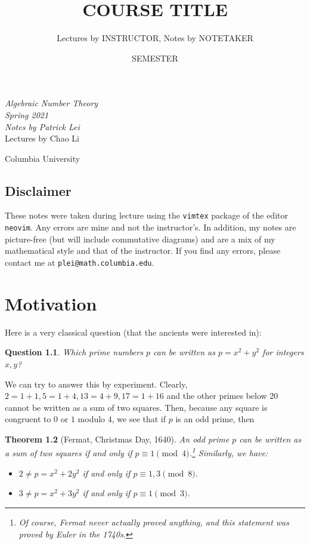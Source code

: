\documentclass[leqno, openany]{memoir}
\title{COURSE TITLE}
\author{Lectures by INSTRUCTOR, Notes by NOTETAKER}
\date{SEMESTER}
\newtheorem{thm}{Theorem}[section]
\newtheorem{quest}[thm]{Question}
\theoremstyle{definition}
\theoremstyle{remark}
\theoremstyle{plain}
\theoremstyle{definition}
\theoremstyle{remark}
\newcommand*{\titleSW}
    {\begingroup%
    \raggedleft
    \vspace*{\baselineskip}
    {\Huge\itshape Algebraic Number Theory \\ Spring 2021}\\[\baselineskip]
    {\large\itshape Notes by Patrick Lei}\\[0.2\textheight]
    {\Large Lectures by Chao Li}\par
    \vfill
    {\Large \sffamily Columbia University}
    \vspace*{\baselineskip}
\endgroup}
\begin{document}
    
\begin{titlingpage}
\titleSW
\end{titlingpage}

\thispagestyle{empty}
\section*{Disclaimer}%
\label{sec:disclaimer}

These notes were taken during lecture using the \texttt{vimtex} package of the
editor \texttt{neovim}.  Any errors are mine and not the instructor's.  In
addition, my notes are picture-free (but will include commutative diagrams) and
are a mix of my mathematical style and that of the instructor.  If you find any
errors, please contact me at \texttt{plei@math.columbia.edu}.

\newpage

\tableofcontents


\chapter{Motivation}%

Here is a very classical question (that the ancients were interested in):

\begin{quest} Which prime numbers $p$ can be written as $p = x^2 + y^2$ for
integers $x,y$?  \end{quest}

We can try to answer this by experiment. Clearly, $2=1+1,5=1+4,13=4+9,17=1+16$
and the other primes below $20$ cannot be written as a sum of two squares.
Then, because any square is congruent to $0$ or $1$ modulo $4$, we see that if
$p$ is an odd prime, then

\begin{thm}[Fermat, Christmas Day, 1640] An odd prime $p$ can be written as a
    sum of two squares if and only if $p \equiv 1 \pmod 4$.\footnote{Of course,
    Fermat never actually proved anything, and this statement was proved by
Euler in the 1740s.} Similarly, we have: \begin{itemize} \item $2 \neq p = x^2
+ 2y^2$ if and only if $p \equiv 1,3 \pmod 8$.  \item $3 \neq p = x^2 + 3y^2$
if and only if $p \equiv 1 \pmod 3$.  \end{itemize} \end{thm}
\end{document}
